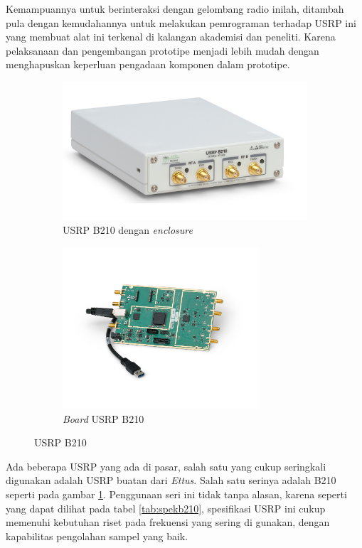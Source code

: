Kemampuannya untuk berinteraksi dengan gelombang radio inilah, ditambah pula dengan kemudahannya untuk melakukan pemrograman terhadap USRP ini yang membuat alat ini terkenal di kalangan akademisi dan peneliti. Karena pelaksanaan dan pengembangan prototipe menjadi lebih mudah dengan menghapuskan keperluan pengadaan komponen dalam prototipe.

\begin{center}
	\begin{figure}[h!]
		\begin{subfigure}[b]{0.5\linewidth}
			\includegraphics[width=\linewidth]{pics/bab2/B210.jpg}
			\caption{USRP B210 dengan \textit{enclosure}}
		\end{subfigure}
		\begin{subfigure}[b]{0.5\linewidth}
			\includegraphics[width=7.3cm]{pics/bab2/B210Board.jpg}
			\caption{\textit{Board} USRP B210}
		\end{subfigure}
		\caption{USRP B210}
		\label{pic:gambarusrp}
	\end{figure}
\end{center}

Ada beberapa USRP yang ada di pasar, salah satu yang cukup seringkali digunakan adalah USRP buatan dari \textit{Ettus}. Salah satu serinya adalah B210 seperti pada gambar \ref{pic:gambarusrp}. Penggunaan seri ini tidak tanpa alasan, karena seperti yang dapat dilihat pada tabel \ref{tab:spekb210}, spesifikasi USRP ini cukup memenuhi kebutuhan riset pada frekuensi yang sering di gunakan, dengan kapabilitas pengolahan sampel yang baik.

